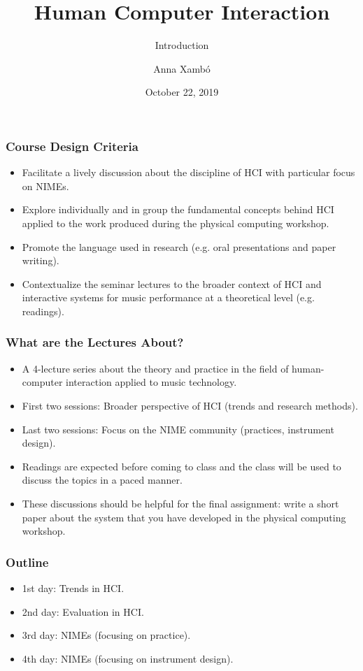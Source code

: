 \documentclass[screen, aspectratio=169]{beamer}
\title[HCI-intro]{Human Computer Interaction}
\subtitle{Introduction}
\author[A. Xamb{\'o}]{Anna Xamb{\'o}}
\institute[NTNU]{Department of Music, NTNU}
\date{October 22, 2019}
\begin{document}
\begin{frame}
  \titlepage
\end{frame}


\begin{frame}
\frametitle{Course Design Criteria}
\begin{itemize}
\item Facilitate a lively discussion about the discipline of HCI with particular focus on NIMEs.
\item Explore individually and in group the fundamental concepts behind HCI applied to the work produced during the physical computing workshop.
\item Promote the language used in research (e.g. oral presentations and paper writing).
\item Contextualize the seminar lectures to the broader context of HCI and interactive systems for music performance at a theoretical level (e.g. readings).
\end{itemize}
\end{frame}
%
\begin{frame}
\frametitle{What are the Lectures About?}
\begin{itemize}
\item A 4-lecture series about the theory and practice in the field of human-computer interaction applied to music technology.
\item First two sessions: Broader perspective of HCI (trends and research methods).
\item Last two sessions: Focus on the NIME community (practices, instrument design).
\item Readings are expected before coming to class and the class will be used to discuss the topics in a paced manner.
\item These discussions should be helpful for the final assignment: write a short paper about the system that you have developed in the physical computing workshop.
\end{itemize}
\end{frame}
%
\begin{frame}
\frametitle{Outline}
\begin{itemize}
\item 1st day: Trends in HCI.
\item 2nd day: Evaluation in HCI.
\item 3rd day: NIMEs (focusing on practice).
\item 4th day: NIMEs (focusing on instrument design).
\end{itemize}
\end{frame}
\end{document}
